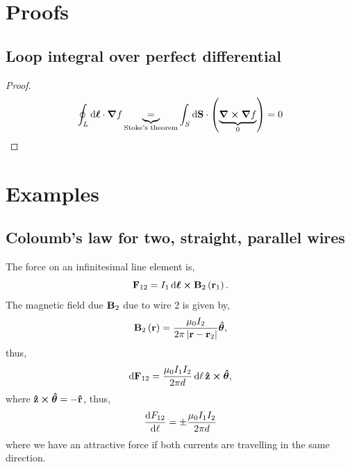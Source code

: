 \documentclass{book}
\begin{document}
\chapter{Proofs}
\section{Loop integral over perfect differential}
\begin{proof}
	\begin{equation}
		\oint_L \dd{\vb*{\ell}} \cdot \grad f \underbrace{=}_{\text{Stoke's theorem}} \int_S \dd{\vb{S}} \cdot\left(\underbrace{\curl{\grad f}}_0\right) = 0
	\end{equation}
\end{proof}
\chapter{Examples}
\section{Coloumb's law for two, straight, parallel wires}
The force on an infinitesimal line element is,
\begin{equation}
	\vb{F}_{12} = I_1\dd{\vb*{\ell}}\cross\vb{B}_2\left(\vb{r}_1\right).
\end{equation}
The magnetic field due $\vb{B}_2$ due to wire 2 is given by,
\begin{equation}
	\vb{B}_2\left(\vb{r}\right) = \frac{\mu_0 I_2}{2\pi\left|\vb{r} - \vb{r}_2\right|}\vu*{\theta},
\end{equation}
thus,
\begin{equation}
	\dd{\vb{F}_{12}} = \frac{\mu_0 I_1I_2}{2\pi d}\dd{\ell}\vu{z}\cross\vu*{\theta},
\end{equation}
where $\vu{z}\cross\vu*{\theta} = - \vu{r}$, thus,
\begin{equation}
	\dv{F_{12}}{\ell} = \pm \frac{\mu_0 I_1I_2}{2\pi d}
\end{equation}
where we have an attractive force if both currents are travelling in the same direction.
\end{document}
